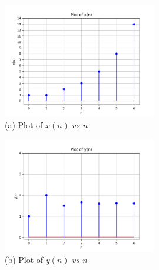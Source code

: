\documentclass[journal,12pt,twocolumn]{IEEEtran}
\theoremstyle{remark}
\begin{document}
	\newpage
	
	\begin{figure}[htbp]
		\centering
		\includegraphics[width=0.6\textwidth]{figures/fig1.png}
		\caption*{\hspace{2cm} (a) Plot of $x(n)$ $vs$ $n$}
	\end{figure}
	
	\begin{figure}[htbp]
		\centering
		\includegraphics[width=0.6\textwidth]{figures/fig2.png}
		\caption*{\hspace{2cm} (b) Plot of $y(n)$ $vs$ $n$}
		
	\end{figure}
	
	
\end{document}
